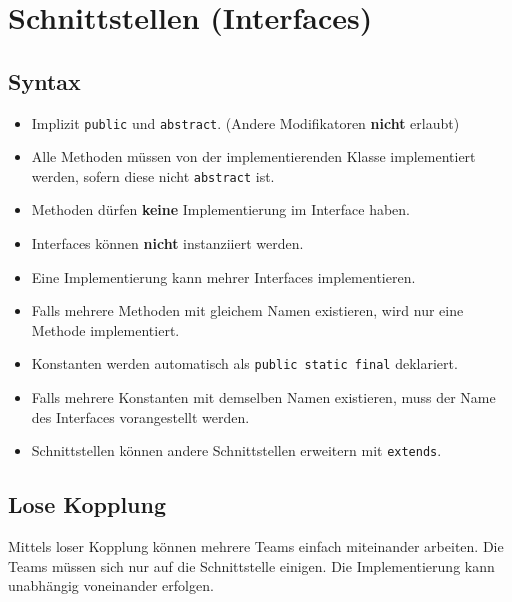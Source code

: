 \section{Schnittstellen (Interfaces)}


\subsection{Syntax}
\begin{minipage}[t]{0.51\columnwidth}
    \raggedright%
    \begin{itemize}
        \item Implizit \lstinline{public} und \lstinline{abstract}. (Andere Modifikatoren \textbf{nicht} erlaubt)
        \item Alle Methoden müssen von der implementierenden Klasse implementiert werden, sofern diese nicht \lstinline{abstract} ist.
        \item Methoden dürfen \textbf{keine} Implementierung im Interface haben.
        \item Interfaces können \textbf{nicht} instanziiert werden.
        \item Eine Implementierung kann mehrer Interfaces implementieren.
        \item Falls mehrere Methoden mit gleichem Namen existieren, wird nur eine Methode implementiert.
        \item Konstanten werden automatisch als \lstinline{public static final} deklariert.
    \end{itemize}
\end{minipage}\hfill%
\begin{minipage}[t]{0.48\columnwidth}
    \vspace{-0.8\abovedisplayskip}
    
    
\end{minipage}

\begin{itemize}
    \item Falls mehrere Konstanten mit demselben Namen existieren, muss der Name des Interfaces vorangestellt werden.
    \item Schnittstellen können andere Schnittstellen erweitern mit \lstinline{extends}.
\end{itemize}


\subsection{Lose Kopplung}
Mittels loser Kopplung können mehrere Teams einfach miteinander arbeiten. 
Die Teams müssen sich nur auf die Schnittstelle einigen. 
Die Implementierung kann unabhängig voneinander erfolgen.

